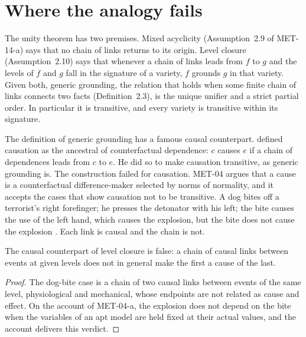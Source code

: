 \documentclass{situationist-preprint}
\begin{document}
\section{Where the analogy fails}

The unity theorem has two premises. Mixed acyclicity (Assumption~2.9 of MET-14-a) says that no chain of links returns to its origin. Level closure (Assumption~2.10) says that whenever a chain of links leads from $f$ to $g$ and the levels of $f$ and $g$ fall in the signature of a variety, $f$ grounds $g$ in that variety. Given both, generic grounding, the relation that holds when some finite chain of links connects two facts (Definition~2.3), is the unique unifier and a strict partial order. In particular it is transitive, and every variety is transitive within its signature.

The definition of generic grounding has a famous causal counterpart. \citet{Lewis1973} defined causation as the ancestral of counterfactual dependence: $c$ causes $e$ if a chain of dependences leads from $c$ to $e$. He did so to make causation transitive, as generic grounding is. The construction failed for causation. MET-04 argues that a cause is a counterfactual difference-maker selected by norms of normality, and it accepts the cases that show causation not to be transitive. A dog bites off a terrorist's right forefinger; he presses the detonator with his left; the bite causes the use of the left hand, which causes the explosion, but the bite does not cause the explosion \citep{McDermott1995,Hall2000}. Each link is causal and the chain is not.

\begin{proposition}\label{p:closure}
The causal counterpart of level closure is false: a chain of causal links between events at given levels does not in general make the first a cause of the last.
\end{proposition}

\begin{proof}
The dog-bite case is a chain of two causal links between events of the same level, physiological and mechanical, whose endpoints are not related as cause and effect. On the account of MET-04-a, the explosion does not depend on the bite when the variables of an apt model are held fixed at their actual values, and the account delivers this verdict.
\end{proof}
\end{document}
